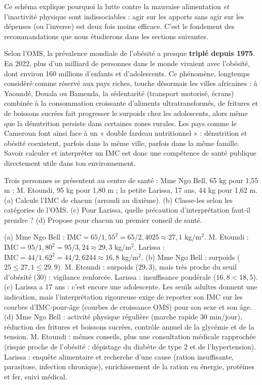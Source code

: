 \documentclass[11pt]{article}
\begin{document}
Ce schéma explique pourquoi la lutte contre la mauvaise alimentation \emph{et} l'inactivité physique sont indissociables : agir sur les apports sans agir sur les dépenses (ou l'inverse) est deux fois moins efficace. C'est le fondement des recommandations que nous étudierons dans les sections suivantes.

\begin{savaistu}
Selon l'OMS, la prévalence mondiale de l'obésité a presque \textbf{triplé depuis 1975}. En 2022, plus d'un milliard de personnes dans le monde vivaient avec l'obésité, dont environ 160 millions d'enfants et d'adolescents. Ce phénomène, longtemps considéré comme réservé aux pays riches, touche désormais les villes africaines : à Yaoundé, Douala ou Bamenda, la sédentarité (transport motorisé, écrans) combinée à la consommation croissante d'aliments ultratransformés, de fritures et de boissons sucrées fait progresser le surpoids chez les adolescents, alors même que la dénutrition persiste dans certaines zones rurales. Les pays comme le Cameroun font ainsi face à un « double fardeau nutritionnel » : dénutrition et obésité coexistent, parfois dans la même ville, parfois dans la même famille. Savoir calculer et interpréter un IMC est donc une compétence de santé publique directement utile dans ton environnement.
\end{savaistu}

\begin{exercice}
Trois personnes se présentent au centre de santé : Mme Ngo Bell, 65 kg pour 1,55 m ; M. Etoundi, 95 kg pour 1,80 m ; la petite Larissa, 17 ans, 44 kg pour 1,62 m. (a) Calcule l'IMC de chacun (arrondi au dixième). (b) Classe-les selon les catégories de l'OMS. (c) Pour Larissa, quelle précaution d'interprétation faut-il prendre ? (d) Propose pour chacun un premier conseil de santé.
\end{exercice}

\begin{corrige}
(a) Mme Ngo Bell : $\mathrm{IMC} = 65/1,55^{2} = 65/2,4025 \approx 27,1$ kg/m$^{2}$. M. Etoundi : $\mathrm{IMC} = 95/1,80^{2} = 95/3,24 \approx 29,3$ kg/m$^{2}$. Larissa : $\mathrm{IMC} = 44/1,62^{2} = 44/2,6244 \approx 16,8$ kg/m$^{2}$.
(b) Mme Ngo Bell : surpoids ($25 \leq 27,1 \leq 29,9$). M. Etoundi : surpoids ($29,3$), mais très proche du seuil d'obésité (30) : vigilance renforcée. Larissa : insuffisance pondérale ($16,8 < 18,5$).
(c) Larissa a 17 ans : c'est encore une adolescente. Les seuils adultes donnent une indication, mais l'interprétation rigoureuse exige de reporter son IMC sur les courbes d'IMC-pour-âge (courbes de croissance OMS) pour son sexe et son âge.
(d) Mme Ngo Bell : activité physique régulière (marche rapide 30 min/jour), réduction des fritures et boissons sucrées, contrôle annuel de la glycémie et de la tension. M. Etoundi : mêmes conseils, plus une consultation médicale rapprochée (risque proche de l'obésité : dépistage du diabète de type 2 et de l'hypertension). Larissa : enquête alimentaire et recherche d'une cause (ration insuffisante, parasitose, infection chronique), enrichissement de la ration en énergie, protéines et fer, suivi médical.
\end{corrige}
\end{document}
